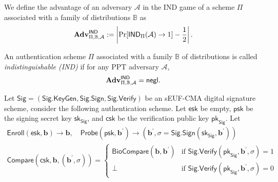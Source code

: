 



We define the advantage of an adversary $\mathcal{A}$ in the \textsf{IND} game of a scheme $\Pi$ associated with a family of distributions $\mathbb{B}$ as
\[
	\mathbf{Adv}^{\textsf{IND}}_{\Pi, \mathbb{B}, \mathcal{A}} := \left |\Pr[\textsf{IND}_{\Pi}(\mathcal{A}) \to 1] - \frac{1}{2} \right|.
\]

An authentication scheme $\Pi$ associated with a family $\mathbb{B}$ of distributions is called \emph{indistinguishable (IND)} if for any PPT adversary $\mathcal{A}$,
\[
	\mathbf{Adv}^{\textsf{IND}}_{\Pi, \mathbb{B}, \mathcal{A}} = \mathsf{negl}.
\]


Let $\textsf{Sig} = (\textsf{Sig.KeyGen}, \allowbreak \textsf{Sig.Sign}, \textsf{Sig.Verify})$ be an sEUF-CMA digital signature scheme, consider the following authentication scheme. Let $\textsf{esk}$ be empty, $\textsf{psk}$ be the signing secret key $\textsf{sk}_\textsf{Sig}$, and $\textsf{csk}$ be the verification public key $\textsf{pk}_\textsf{Sig}$. Let 
\begin{gather*}
	\textsf{Enroll}(\textsf{esk}, \mathbf{b}) \to \mathbf{b}, \quad \textsf{Probe}(\textsf{psk}, \mathbf{b}^\prime ) \to (\mathbf{b}^\prime , \sigma = \textsf{Sig.Sign}(\textsf{sk}_\textsf{Sig}, \mathbf{b}^\prime ) ) \\
	\textsf{Compare}(\textsf{csk}, \mathbf{b}, (\mathbf{b}^\prime, \sigma)) = \begin{cases}
		\textsf{BioCompare}(\mathbf{b}, \mathbf{b}^\prime ) & \text{if } \textsf{Sig.Verify}(\textsf{pk}_\textsf{Sig}, \mathbf{b}^\prime, \sigma) = 1 \\
		\bot & \text{if } \textsf{Sig.Verify}(\textsf{pk}_\textsf{Sig}, \mathbf{b}^\prime, \sigma) = 0
	\end{cases}
\end{gather*}


